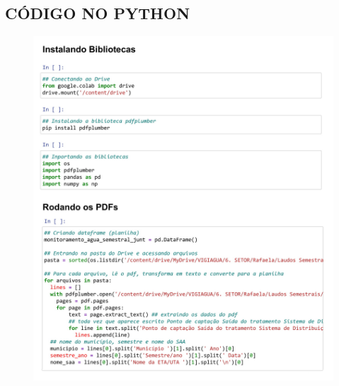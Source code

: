 \postextual



%

\begin{apendicesenv}

\partapendices

\chapter{CÓDIGO NO PYTHON}

\begin{figure}[!htb]
\centering
\includegraphics[scale=0.4]{colab/laudos 1.png}
\label{fig04}
\end{figure}


\end{apendicesenv}
